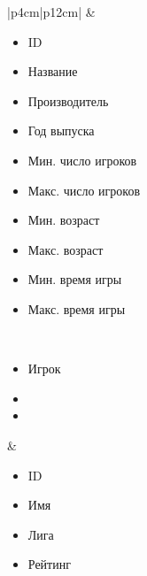 \begin{table}[h!]
\begin{center}
\begin{threeparttable}
\begin{tabular}{|p{4cm}|p{12cm}|}
          & \begin{minipage}[t]{\linewidth}
              \begin{multicols}{2}
                \begin{itemize}[labelsep=0mm,nosep,after=\strut]
                  \item[] ID
                  \item[] Название
                  \item[] Производитель
                  \item[] Год выпуска
                  \item[] Мин. число игроков
                  \item[] Макс. число игроков
                  \item[] Мин. возраст
                  \item[] Макс. возраст
                  \item[] Мин. время игры
                  \item[] Макс. время игры
                \end{itemize}
              \end{multicols}
            \end{minipage}\\
            \hline
            \begin{minipage}[t]{\linewidth}
              \begin{multicols}{1}
                \begin{itemize}[labelsep=0mm,nosep,after=\strut]
                  \item[] Игрок
                  \item[]
                  \item[]
                \end{itemize}
              \end{multicols}
            \end{minipage}
          & \begin{minipage}[t]{\linewidth}
              \begin{multicols}{2}
                \begin{itemize}[labelsep=0mm,nosep,after=\strut]
                  \item[] ID
                  \item[] Имя
                  \item[] Лига
                  \item[] Рейтинг
                \end{itemize}

\end{multicols}
\end{minipage}
\end{tabular}
\end{threeparttable}
\end{center}
\end{table}
